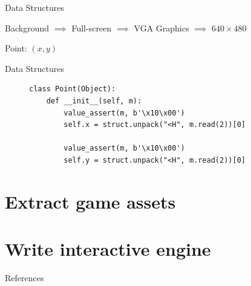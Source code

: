 \documentclass[xcolor={dvipsnames,table},aspectratio=169]{beamer}
\begin{document}
\begin{frame}[label=current]{Data Structures}
  \begin{center}
    Background $\implies$ Full-screen $\implies$ VGA Graphics $\implies$
    $640\times 480$
  \end{center}\vspace{-1.5em}\pause
  \begin{center}
    \Large Point: $(x, y)$
  \end{center}
\end{frame}

\begin{frame}[fragile,label=current]{Data Structures}
\begin{figure}
\begin{lstlisting}
class Point(Object):
    def __init__(self, m):
        value_assert(m, b'\x10\x00')
        self.x = struct.unpack("<H", m.read(2))[0]

        value_assert(m, b'\x10\x00')
        self.y = struct.unpack("<H", m.read(2))[0]
\end{lstlisting}
\end{figure}
\end{frame}

\section{Extract game assets}

\section{Write interactive engine}

\begin{frame}[allowframebreaks]{References}
  
  
\end{frame}
\end{document}
